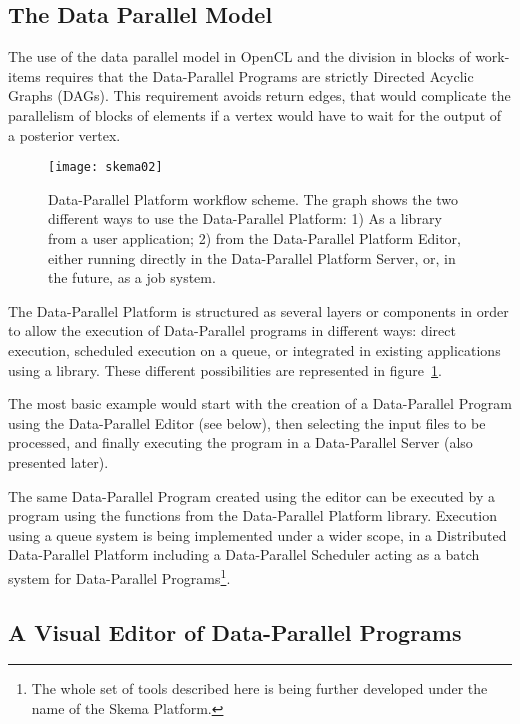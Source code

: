 \documentclass[conference]{IEEEtran}
\newcommand{\is}{250pt} \newcommand{\iss}{250pt}
\begin{document}
\subsection{The Data Parallel Model}


The use of the data parallel model in OpenCL and the division in blocks of
work-items requires that the Data-Parallel Programs are strictly Directed
Acyclic Graphs (DAGs). This requirement avoids return edges, that would
complicate the parallelism of blocks of elements if a vertex would have to wait
for the output of a posterior vertex.
  


\begin{figure}[t]
\begin{center}
\texttt{[image: skema02]}
\end{center}
\caption{Data-Parallel Platform workflow scheme. The graph shows the two
  different ways to use the Data-Parallel Platform: 1) As a library from a user
  application; 2) from the Data-Parallel Platform Editor, either running
  directly in the Data-Parallel Platform Server, or, in the future, as a job
  system.}
\label{fig:workflow01}
\end{figure}

The Data-Parallel Platform is structured as several layers or components in
order to allow the execution of Data-Parallel programs in different ways: direct
execution, scheduled execution on a queue, or integrated in existing
applications using a library.  These different possibilities are represented in
figure~\ref{fig:workflow01}.

The most basic example would start with the creation of a Data-Parallel Program
using the Data-Parallel Editor (see below), then selecting the input files to be
processed, and finally executing the program in a Data-Parallel Server (also
presented later).

The same Data-Parallel Program created using the editor can be executed by a
program using the functions from the Data-Parallel Platform library.  Execution
using a queue system is being implemented under a wider scope, in a Distributed
Data-Parallel Platform including a Data-Parallel Scheduler acting as a batch
system for Data-Parallel Programs\footnote{The whole set of tools described here
  is being further developed under the name of the Skema Platform.}.

\subsection{A Visual Editor of Data-Parallel Programs}
\end{document}
